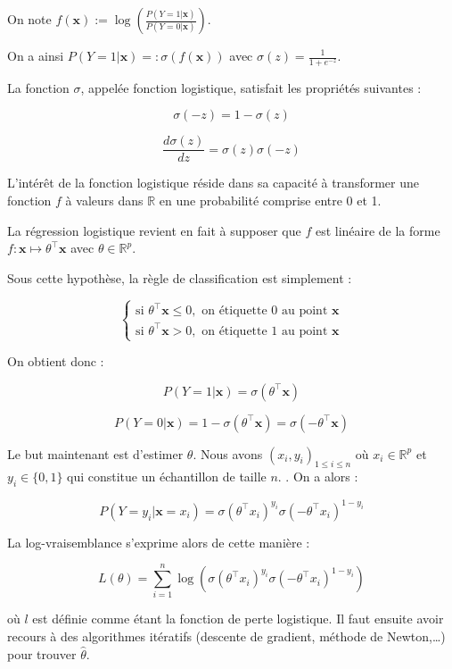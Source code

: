 \documentclass[
  letterpaper,
  DIV=11,
  numbers=noendperiod]{scrartcl}
\begin{document}
On note
\(f(\mathbf{x}) := \log\left(\frac{P(Y=1|\mathbf{x})}{P(Y=0|\mathbf{x})}\right)\).

On a ainsi \(P(Y=1|\mathbf{x}) =: \sigma(f(\mathbf{x}))\) avec
\(\sigma(z) = \frac{1}{1 + e^{-z}}\).

La fonction \(\sigma\), appelée fonction logistique, satisfait les
propriétés suivantes :

\[
\sigma(-z) = 1 - \sigma(z)
\]

\[
\frac{d\sigma(z)}{dz} = \sigma(z) \sigma(-z)
\]

L'intérêt de la fonction logistique réside dans sa capacité à
transformer une fonction \(f\) à valeurs dans \(\mathbb{R}\) en une
probabilité comprise entre 0 et 1.

La régression logistique revient en fait à supposer que \(f\) est
linéaire de la forme \(f : \mathbf{x} \mapsto {\theta}^\top \mathbf{x}\)
avec \({\theta} \in \mathbb{R}^p\).

Sous cette hypothèse, la règle de classification est simplement :

\[
\begin{cases}
\text{si } {\theta}^\top \mathbf{x}\leq 0 , \text{ on étiquette 0 au point } \mathbf{x} \\
\text{si } {\theta}^\top \mathbf{x} > 0, \text{ on étiquette 1 au point } \mathbf{x}
\end{cases}
\]

On obtient donc :

\[
P(Y=1|\mathbf{x}) = \sigma({\theta}^\top \mathbf{x})
\]

\[ 
P(Y=0|\mathbf{x}) = 1- \sigma({\theta}^\top \mathbf{x}) = \sigma(-{\theta}^\top \mathbf{x})
\]

Le but maintenant est d'estimer \({\theta}\). Nous avons
\((x_i, y_i)_{1 \leq i \leq n}\) où \(x_i \in \mathbb{R}^p\) et
\(y_i \in \{0,1\}\) qui constitue un échantillon de taille \(n\). . On a
alors :

\[
P(Y = y_i | \mathbf{x} = x_i) = \sigma({\theta}^\top x_i)^{y_i} \sigma(-{\theta}^\top x_i)^{1-y_i}
\]

La log-vraisemblance s'exprime alors de cette manière :

\[ 
L({\theta}) = \sum_{i=1}^{n} \log\left( \sigma({\theta}^\top x_i)^{y_i} \sigma(-{\theta}^\top x_i)^{1-y_i} \right)
\]

où \(l\) est définie comme étant la fonction de perte logistique. Il
faut ensuite avoir recours à des algorithmes itératifs (descente de
gradient, méthode de Newton,\ldots) pour trouver \({\hat{\theta}}\).
\end{document}

